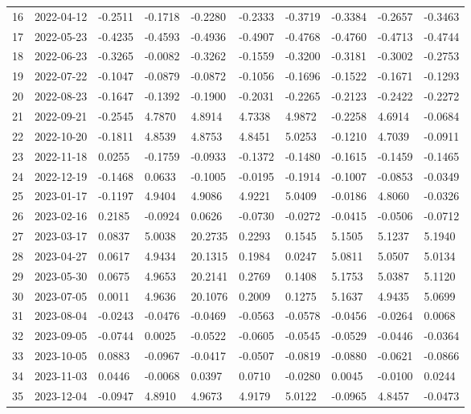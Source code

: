 {\begin{longtable}{llllllllll}
16 & 2022-04-12 & -0.2511 & -0.1718 & -0.2280 & -0.2333 & -0.3719 & -0.3384 & -0.2657 & -0.3463 \\
17 & 2022-05-23 & -0.4235 & -0.4593 & -0.4936 & -0.4907 & -0.4768 & -0.4760 & -0.4713 & -0.4744 \\
18 & 2022-06-23 & -0.3265 & -0.0082 & -0.3262 & -0.1559 & -0.3200 & -0.3181 & -0.3002 & -0.2753 \\
19 & 2022-07-22 & -0.1047 & -0.0879 & -0.0872 & -0.1056 & -0.1696 & -0.1522 & -0.1671 & -0.1293 \\
20 & 2022-08-23 & -0.1647 & -0.1392 & -0.1900 & -0.2031 & -0.2265 & -0.2123 & -0.2422 & -0.2272 \\
21 & 2022-09-21 & -0.2545 & 4.7870 & 4.8914 & 4.7338 & 4.9872 & -0.2258 & 4.6914 & -0.0684 \\
22 & 2022-10-20 & -0.1811 & 4.8539 & 4.8753 & 4.8451 & 5.0253 & -0.1210 & 4.7039 & -0.0911 \\
23 & 2022-11-18 & 0.0255 & -0.1759 & -0.0933 & -0.1372 & -0.1480 & -0.1615 & -0.1459 & -0.1465 \\
24 & 2022-12-19 & -0.1468 & 0.0633 & -0.1005 & -0.0195 & -0.1914 & -0.1007 & -0.0853 & -0.0349 \\
25 & 2023-01-17 & -0.1197 & 4.9404 & 4.9086 & 4.9221 & 5.0409 & -0.0186 & 4.8060 & -0.0326 \\
26 & 2023-02-16 & 0.2185 & -0.0924 & 0.0626 & -0.0730 & -0.0272 & -0.0415 & -0.0506 & -0.0712 \\
27 & 2023-03-17 & 0.0837 & 5.0038 & 20.2735 & 0.2293 & 0.1545 & 5.1505 & 5.1237 & 5.1940 \\
28 & 2023-04-27 & 0.0617 & 4.9434 & 20.1315 & 0.1984 & 0.0247 & 5.0811 & 5.0507 & 5.0134 \\
29 & 2023-05-30 & 0.0675 & 4.9653 & 20.2141 & 0.2769 & 0.1408 & 5.1753 & 5.0387 & 5.1120 \\
30 & 2023-07-05 & 0.0011 & 4.9636 & 20.1076 & 0.2009 & 0.1275 & 5.1637 & 4.9435 & 5.0699 \\
31 & 2023-08-04 & -0.0243 & -0.0476 & -0.0469 & -0.0563 & -0.0578 & -0.0456 & -0.0264 & 0.0068 \\
32 & 2023-09-05 & -0.0744 & 0.0025 & -0.0522 & -0.0605 & -0.0545 & -0.0529 & -0.0446 & -0.0364 \\
33 & 2023-10-05 & 0.0883 & -0.0967 & -0.0417 & -0.0507 & -0.0819 & -0.0880 & -0.0621 & -0.0866 \\
34 & 2023-11-03 & 0.0446 & -0.0068 & 0.0397 & 0.0710 & -0.0280 & 0.0045 & -0.0100 & 0.0244 \\
35 & 2023-12-04 & -0.0947 & 4.8910 & 4.9673 & 4.9179 & 5.0122 & -0.0965 & 4.8457 & -0.0473 \\
\end{longtable}
}
